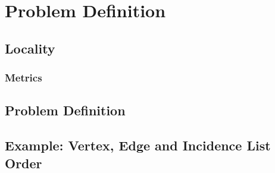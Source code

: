 \chapter{Problem Definition}\label{\positionnumber}
\section{Locality}\label{\positionnumber}
    
    \subsection*{Metrics} 
        
\section{Problem Definition}\label{\positionnumber}

\section{Example: Vertex, Edge and Incidence List Order}


